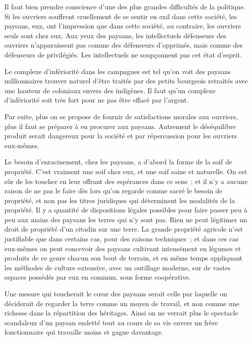 \documentclass[french,twoside]{book} %
\begin{document}
Il faut bien prendre conscience d'une des plus grandes difficultés de la politique. Si les ouvriers souffrent cruellement de se sentir en exil dans cette société, les paysans, eux, ont l'impression que dans cette société, au contraire, les ouvriers seuls sont chez eux. Aux yeux des paysans, les intellectuels défenseurs des ouvriers n'apparaissent pas comme des défenseurs d'opprimés, mais comme des défenseurs de privilégiés. Les intellectuels ne soupçonnent pas cet état d'esprit.\par
Le complexe d'infériorité dans les campagnes est tel qu'on voit des paysans millionnaires trouver naturel d'être traités par des petits bourgeois retraités avec une hauteur de coloniaux envers des indigènes. Il faut qu'un complexe d'infériorité soit très fort pour ne pas être effacé par l'argent.\par
Par suite, plus on se propose de fournir de satisfactions morales aux ouvriers, plus il faut se préparer à en procurer aux paysans. Autrement le déséquilibre produit serait dangereux pour la société et par répercussion pour les ouvriers eux-mêmes.\par
Le besoin d'enracinement, chez les paysans, a d'abord la forme de la soif de propriété. C'est vraiment une soif chez eux, et une soif saine et naturelle. On est sûr de les toucher en leur offrant des espérances dans ce sens ; et il n'y a aucune raison de ne pas le faire dès lors qu'on regarde comme sacré le besoin de propriété, et non pas les titres juridiques qui déterminent les modalités de la propriété. Il y a quantité de dispositions légales possibles pour faire passer peu à peu aux mains des paysans les terres qui n'y sont pas. Rien ne peut légitimer un droit de propriété d'un citadin sur une terre. La grande propriété agricole n'est justifiable que dans certains cas, pour des raisons techniques ; et dans ces cas eux-mêmes on peut concevoir des paysans cultivant intensément en légumes et produits de ce genre chacun son bout de terrain, et en même temps appliquant les méthodes de culture extensive, avec un outillage moderne, sur de vastes espaces possédés par eux en commun, sous forme coopérative.\par
Une mesure qui toucherait le cœur des paysans serait celle par laquelle on déciderait de regarder la terre comme un moyen de travail, et non comme une richesse dans la répartition des héritages. Ainsi on ne verrait plus le spectacle scandaleux d'un paysan endetté tout au cours de sa vie envers un frère fonctionnaire qui travaille moins et gagne davantage.\par
\end{document}

